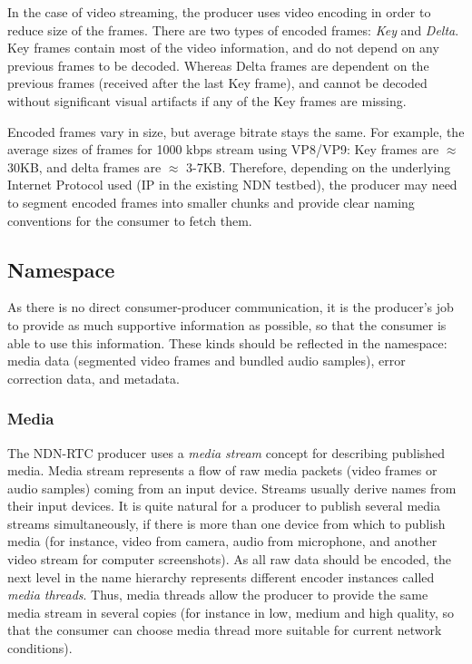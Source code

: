 \documentclass{icn/sig-alternate-2012} %
\newcommand{\ndnrtcName}{NDN-RTC} %
\begin{document}
In the case of video streaming, the producer uses video encoding in order to reduce size of the frames. There are two types of encoded frames: \textit{Key} and \textit{Delta}. Key frames contain most of the video information, and do not depend on any previous frames to be decoded. Whereas Delta frames are dependent on the previous frames (received after the last Key frame), and cannot be decoded without significant visual artifacts if any of the Key frames are missing.

Encoded frames vary in size, but average bitrate stays the same. For example, the average sizes of frames for 1000 kbps stream using VP8/VP9: Key frames are $\approx$ 30KB, and delta frames are $\approx$ 3-7KB.
Therefore, depending on the underlying Internet Protocol used (IP in the existing NDN testbed), the producer may need to segment encoded frames into smaller chunks and provide clear naming conventions for the consumer to fetch them.




\subsection{Namespace}

As there is no direct consumer-producer communication, it is the producer's job to provide as much supportive information as possible, so that the consumer is able to use this information. These kinds should be reflected in the namespace:
media data (segmented video frames and bundled audio samples), error correction data, and metadata. 


\subsubsection{Media} 

The \ndnrtcName{} producer uses a \textit{media stream} concept for describing published media. Media stream represents a flow of raw media packets (video frames or audio samples) coming from an input device. Streams usually derive names from their input devices. It is quite natural for a producer to publish several media streams simultaneously, if there is more than one device from which to publish media (for instance, video from camera, audio from microphone, and another video stream for computer screenshots). As all raw data should be encoded, the next level in the name hierarchy represents different encoder instances called \textit{media threads}. Thus, media threads allow the producer to provide the same media stream in several copies (for instance in low, medium and high quality, so that the consumer can choose media thread more suitable for current network conditions).
\end{document}
